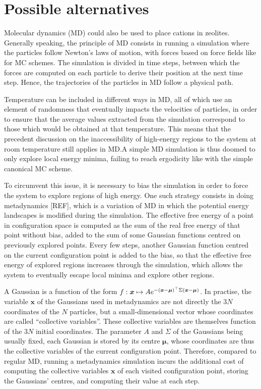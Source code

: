 \documentclass[main.tex]{subfiles}
\begin{document}
\section{Possible alternatives}

\label{metadynamics}

Molecular dynamics (MD) could also be used to place cations in zeolites. Generally speaking, the principle of MD consists in running a simulation where the particles follow Newton's laws of motion, with forces based on force fields like for MC schemes. The simulation is divided in time steps, between which the forces are computed on each particle to derive their position at the next time step. Hence, the trajectories of the particles in MD follow a physical path.

Temperature can be included in different ways in MD, all of which use an element of randomness that eventually impacts the velocities of particles, in order to ensure that the average values extracted from the simulation correspond to those which would be obtained at that temperature. This means that the precedent discussion on the inaccessibility of high-energy regions to the system at room temperature still applies in MD.\@ A simple MD simulation is thus doomed to only explore local energy minima, failing to reach ergodicity like with the simple canonical MC scheme.

To circumvent this issue, it is necessary to bias the simulation in order to force the system to explore regions of high energy. One such strategy consists in doing metadynamics [REF], which is a variation of MD in which the potential energy landscapes is modified during the simulation. The effective free energy of a point in configuration space is computed as the sum of the real free energy of that point without bias, added to the sum of some Gaussian functions centred on previously explored points. Every few steps, another Gaussian function centred on the current configuration point is added to the bias, so that the effective free energy of explored regions increases through the simulation, which allows the system to eventually escape local minima and explore other regions.

A Gaussian is a function of the form $f:\boldsymbol x\mapsto Ae^{-\left(\boldsymbol x - \boldsymbol\mu\right)^\top\Sigma\left(\boldsymbol x - \boldsymbol\mu\right)}$. In practise, the variable $\boldsymbol x$ of the Gaussians used in metadynamics are not directly the $3N$ coordinates of the $N$ particles, but a small-dimensional vector whose coordinates are called ``collective variables''. These collective variables are themselves function of the $3N$ initial coordinates. The parameter $A$ and $\Sigma$ of the Gaussians being usually fixed, each Gaussian is stored by its centre $\boldsymbol\mu$, whose coordinates are thus the collective variables of the current configuration point. Therefore, compared to regular MD, running a metadynamics simulation incurs the additional cost of computing the collective variables $\boldsymbol x$ of each visited configuration point, storing the Gaussians' centres, and computing their value at each step.
\end{document}
